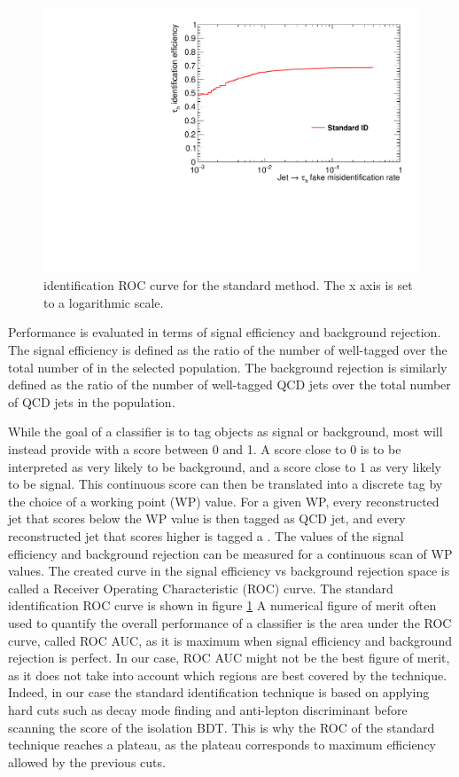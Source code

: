 \begin{figure}
    \centering
    \includegraphics[width=\textwidth]{Images/ROC_comp_std.pdf}
    \caption{\tauh identification ROC curve for the standard method. The x axis is set to a logarithmic scale.}
    \label{fig:std_ROC}
\end{figure}

Performance is evaluated in terms of signal efficiency and background rejection. The signal efficiency is defined as the ratio of the number of well-tagged \tauh over the total number of \tauh in the selected population. The background rejection is similarly defined as the ratio of the number of well-tagged QCD jets over the total number of QCD jets in the population.

While the goal of a classifier is to tag objects as signal or background, most will instead provide with a score between 0 and 1. A score close to 0 is to be interpreted as very likely to be background, and a score close to 1 as very likely to be signal. This continuous score can then be translated into a discrete tag by the choice of a working point (WP) value. For a given WP, every reconstructed jet that scores below the WP value is then tagged as QCD jet, and every reconstructed jet that scores higher is tagged a \tauh. The values of the signal efficiency and background rejection can be measured for a continuous scan of WP values. The created curve in the signal efficiency vs background rejection space is called a Receiver Operating Characteristic (ROC) curve. The standard identification ROC curve is shown in figure \ref{fig:std_ROC}
A numerical figure of merit often used to quantify the overall performance of a classifier is the area under the ROC curve, called ROC AUC, as it is maximum when signal efficiency and background rejection is perfect.
In our case, ROC AUC might not be the best figure of merit, as it does not take into account which regions are best covered by the technique. Indeed, in our case the standard identification technique is based on applying hard cuts such as decay mode finding and anti-lepton discriminant before scanning the score of the isolation BDT. This is why the ROC of the standard technique reaches a plateau, as the plateau corresponds to maximum efficiency allowed by the previous cuts.


